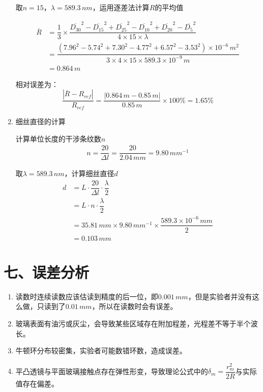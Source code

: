 \documentclass[11pt]{article}
\begin{document}
\begin{enumerate}
    取$n=15$，$\lambda=589.3\,nm$，运用逐差法计算$R$的平均值

    \begin{align*}
        \overline{R}&=\dfrac{1}{3}\times\dfrac{\overline{D_{30}}^2-\overline{D_{15}}^2+\overline{D_{25}}^2-\overline{D_{10}}^2+\overline{D_{20}}^2-\overline{D_{5}}^2}{4\times15\times\lambda} \\
        &=\dfrac{(7.96^2-5.74^2+7.30^2-4.77^2+6.57^2-3.53^2)\times10^{-6}\,m^2}{3\times4\times15\times589.3\times10^{-9}\,m} \\
        &=0.864\,m
    \end{align*}

    相对误差为：
    $$
    \dfrac{|\overline{R}-R_{ref}|}{R_{ref}}=\dfrac{|0.864\,m-0.85\,m|}{0.85\,m}\times100\%=1.65\%
    $$

    \item 细丝直径的计算
    
    计算单位长度的干涉条纹数$n$
    \begin{align*}
        n=\dfrac{20}{\Delta l}=\dfrac{20}{2.04\,mm}=9.80\,mm^{-1}
    \end{align*}
    
    取$\lambda=589.3\,nm$，计算细丝直径$d$
    \begin{align*}
        d&=L\cdot\dfrac{20}{\Delta l}\cdot\dfrac{\lambda}{2} \\
        &=L\cdot n\cdot\dfrac{\lambda}{2} \\
        &=35.81\,mm\times9.80\,mm^{-1}\times\dfrac{589.3\times10^{-6}\,mm}{2} \\
        &=0.103\,mm
    \end{align*}
\end{enumerate}

\section*{七、误差分析}

\begin{enumerate}
    \item 读数时连续读数应该估读到精度的后一位，即$0.001\,mm$，但是实验者并没有这么做，只读到了$0.01\,mm$，所以在读数时会有误差。
    \item 玻璃表面有油污或灰尘，会导致某些区域存在附加程差，光程差不等于半个波长。
    \item 牛顿环分布较密集，实验者可能数错环数，造成误差。
    \item 平凸透镜与平面玻璃接触点存在弹性形变，导致理论公式中的$\delta_m=\dfrac{r_m^2}{2R}$与实际值存在偏差。
\end{enumerate}
\end{document}
